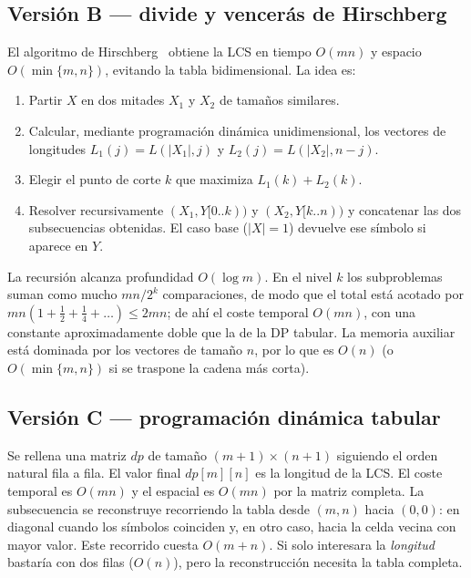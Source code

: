 \documentclass[11pt,a4paper]{article}
\begin{document}
\subsection{Versión B — divide y vencerás de Hirschberg}

El algoritmo de Hirschberg~\cite{hirschberg1975} obtiene la LCS en
tiempo $O(mn)$ y espacio $O(\min\{m,n\})$, evitando la tabla
bidimensional. La idea es:

\begin{enumerate}
    \item Partir $X$ en dos mitades $X_1$ y $X_2$ de tamaños similares.
    \item Calcular, mediante programación dinámica unidimensional, los
          vectores de longitudes $L_{1}(j)=L(|X_1|,j)$ y
          $L_{2}(j)=L(|X_2|,n-j)$.
    \item Elegir el punto de corte $k$ que maximiza $L_1(k)+L_2(k)$.
    \item Resolver recursivamente $(X_1, Y[0..k))$ y $(X_2, Y[k..n))$ y
          concatenar las dos subsecuencias obtenidas. El caso base
          ($|X|=1$) devuelve ese símbolo si aparece en $Y$.
\end{enumerate}

La recursión alcanza profundidad $O(\log m)$. En el nivel $k$ los
subproblemas suman como mucho $mn/2^{k}$ comparaciones, de modo que el
total está acotado por $mn(1+\tfrac12+\tfrac14+\dots)\le 2mn$; de ahí el
coste temporal $O(mn)$, con una constante aproximadamente doble que la
de la DP tabular.
La memoria auxiliar está dominada por los vectores de tamaño $n$, por lo
que es $O(n)$ (o $O(\min\{m,n\})$ si se traspone la cadena más corta).

\subsection{Versión C — programación dinámica tabular}

Se rellena una matriz $\mathit{dp}$ de tamaño $(m+1)\times(n+1)$
siguiendo el orden natural fila a fila. El valor final
$\mathit{dp}[m][n]$ es la longitud de la LCS. El coste temporal es
$O(mn)$ y el espacial es $O(mn)$ por la matriz completa. La
subsecuencia se reconstruye recorriendo la tabla desde $(m,n)$ hacia
$(0,0)$: en diagonal cuando los símbolos coinciden y, en otro caso, hacia
la celda vecina con mayor valor. Este recorrido cuesta $O(m+n)$. Si solo
interesara la \emph{longitud} bastaría con dos filas ($O(n)$), pero la
reconstrucción necesita la tabla completa.
\end{document}
